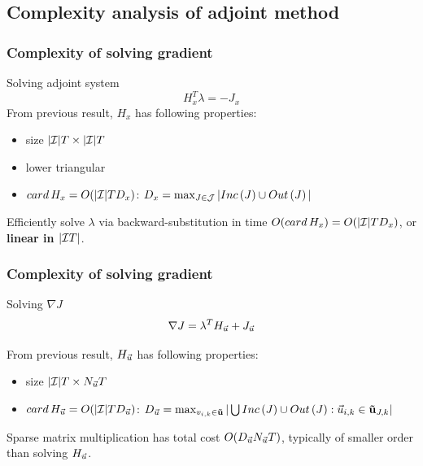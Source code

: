 \subsection[complexity]{Complexity analysis of adjoint method} %
\label{sec:complexity_analysis_of_adjoint_method}

\begin{frame}[t]\frametitle{Complexity of solving gradient}
    




\begin{block}{Solving adjoint system}
\begin{equation}
    H_x^T \lambda = -J_x
\end{equation}
From previous result, $H_x$ has following properties:

\begin{itemize}
    \item size $|\mathcal{I}|T\times|\mathcal{I}|T$
    \item lower triangular
    \item $card\,H_x = O(|\mathcal{I}|TD_x)$: $D_{x}=\max_{J\in\mathcal{J}}|Inc\left(J\right)\cup Out\left(J\right)|$
\end{itemize}

Efficiently solve $\lambda$ via backward-substitution in time $O(card\,H_x)=O(|\mathcal{I}|TD_x)$, or \textbf{linear in $|\mathcal{I} T|$}.
\end{block}

\end{frame}

\begin{frame}[t]\frametitle{Complexity of solving gradient}
    




\begin{block}{Solving $\nabla J$}
\begin{equation}
    \nabla J = \lambda^T H_{\vec{u}} + J_{\vec{u}}
\end{equation}

From previous result, $H_{\vec{u}}$ has following properties:

\begin{itemize}
    \item size $|\mathcal{I}|T\times N_{\vec{u}}T$
    \item $card\,H_{\vec{u}} = O(|\mathcal{I}|TD_{\vec{u}})$: $D_{\vec{u}}=\max_{v_{i,k}\in\mathbf{\vec{u}}}|\bigcup Inc\left(J\right)\cup Out\left(J\right):\vec{u}_{i,k}\in\mathbf{\vec{u}}_{J,k}|$
\end{itemize}

Sparse matrix multiplication has total cost $O(D_{\vec{u}}N_{\vec{u}}T)$, typically of smaller order than solving $H_{\vec{u}}$.
\end{block}

\end{frame}


